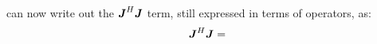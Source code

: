 \documentclass[useAMS,usenatbib]{mn2e}
\newcommand{\mat}[1]{{\bmath{#1}}}
\newcommand{\JJ}{\mat{J}} %
\newcommand{\JHJ}{\JJ^H\JJ} %
\newcommand{\Rop}[1]{\mathcal{R}_{{#1}}}
\newcommand{\Lop}[1]{\mathcal{L}_{{#1}}}
\numberwithin{equation}{section}
\providecommand{\DIFadd}[1]{{\protect\color{blue}\uwave{#1}}} %
\providecommand{\DIFaddend}{} %
\providecommand{\DIFdelbegin}{} %
\begin{document}
\DIFadd{We }\DIFaddend can now write out the $\JHJ$ term, still expressed in terms of operators, as:
\begin{equation}
\label{eq:JHJ:pol}
\JHJ = \DIFdelbegin %
\end{equation}%
\end{document}

